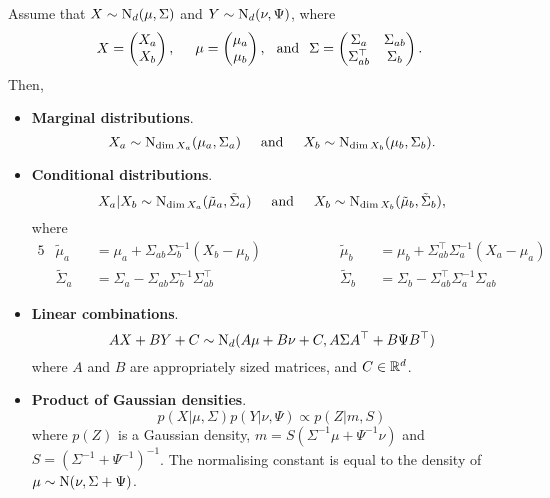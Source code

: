 \begin{lemma}
  Assume that $X \sim \operatorname{N}_d(\mu,\Sigma)$ and $Y \sim \operatorname{N}_{d}(\nu,\Psi)$, where
  \[
    X = 
    \begin{pmatrix}
      X_a \\ X_b
    \end{pmatrix},
    \hspace{0.5cm}
    \mu = 
    \begin{pmatrix}
      \mu_a \\ \mu_b
    \end{pmatrix},
    \hspace{0.25cm}\text{and}\hspace{0.25cm}
    \Sigma = 
    \begin{pmatrix}
      \Sigma_a    &\Sigma_{ab} \\
      \Sigma_{ab}^\top &\Sigma_b \\
    \end{pmatrix}.
  \]
  Then,
  \begin{itemize}
    \item \textbf{Marginal distributions}.
    \[
      X_a \sim \operatorname{N}_{\dim X_a}(\mu_a,\Sigma_a)
      \hspace{0.5cm}\text{and}\hspace{0.5cm}
      X_b \sim \operatorname{N}_{\dim X_b}(\mu_b,\Sigma_b).
    \]
    \item \textbf{Conditional distributions}.
    \[
      X_a|X_b \sim \operatorname{N}_{\dim X_a}(\tilde\mu_a,\tilde\Sigma_a)
      \hspace{0.5cm}\text{and}\hspace{0.5cm}
      X_b \sim \operatorname{N}_{\dim X_b}(\tilde\mu_b,\tilde\Sigma_b),
    \]
    where
    \begin{alignat*}{5}
      & \tilde\mu_a 
      &&= \mu_a + \Sigma_{ab}\Sigma_b^{-1}(X_b-\mu_b)
      &&\hspace{1cm}
      &&\tilde\mu_b 
      &&= \mu_b + \Sigma_{ab}^\top\Sigma_a^{-1}(X_a-\mu_a) \\
      &\tilde\Sigma_a 
      &&= \Sigma_a -  \Sigma_{ab}\Sigma_b^{-1}\Sigma_{ab}^\top
      &&\hspace{1cm}
      &&\tilde\Sigma_b 
      &&= \Sigma_b -  \Sigma_{ab}^\top\Sigma_a^{-1}\Sigma_{ab} 
    \end{alignat*}
    \item \textbf{Linear combinations}. 
    \[
      AX + BY + C \sim \operatorname{N}_{d}(A\mu + B\nu + C, A\Sigma A^\top + B\Psi B^\top)
    \]
    where $A$ and $B$ are appropriately sized matrices, and $C\in\mathbb{R}^d$.
    \item \textbf{Product of Gaussian densities}. 
    \[
      p(X|\mu,\Sigma)p(Y|\nu,\Psi) \propto p(Z|m,S)
    \]
    where $p(Z)$ is a Gaussian density, $m = S(\Sigma^{-1}\mu + \Psi^{-1}\nu)$ and $S= (\Sigma^{-1} + \Psi^{-1})^{-1}$.
    The normalising constant is equal to the density of $\mu\sim\operatorname{N}(\nu,\Sigma + \Psi)$.
  \end{itemize}
\end{lemma}

